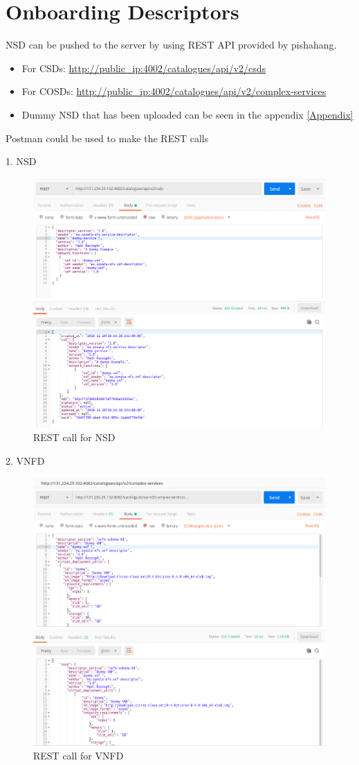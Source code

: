 	\newpage
	
	\section{Onboarding Descriptors}

	NSD can be pushed to the server by using REST API provided by pishahang.
	\begin{itemize}
		\item For CSDs: \hyperlink{name}{http://public\_ip:4002/catalogues/api/v2/csds}
		\item For COSDs: \hyperlink{name}{http://public\_ip:4002/catalogues/api/v2/complex-services}
		\item Dummy NSD that has been uploaded can be seen in the appendix \ref{Appendix}
	\end{itemize}


	Postman could be used to make the REST calls
	
	1. NSD
	\begin{figure}[H]
		\centering
		\includegraphics[width=0.7\linewidth]{figures/CSD}
		\caption{REST call for NSD}
		\label{fig:csd}
	\end{figure}
		
	2. VNFD
	
	\begin{figure}[H]
		\centering
		\includegraphics[width=0.7\linewidth]{figures/COSD}
		\caption{REST call for VNFD}
		\label{fig:cosd}
	\end{figure}

